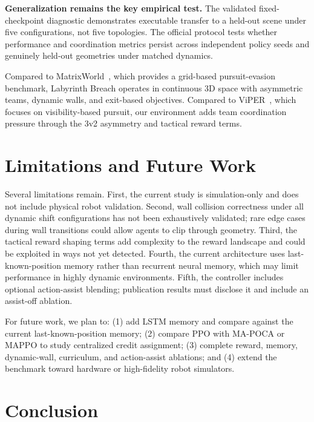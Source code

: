 \documentclass[conference]{IEEEtran}
\begin{document}
\textbf{Generalization remains the key empirical test.} The validated fixed-checkpoint diagnostic demonstrates executable transfer to a held-out scene under five configurations, not five topologies. The official protocol tests whether performance and coordination metrics persist across independent policy seeds and genuinely held-out geometries under matched dynamics.

Compared to MatrixWorld~\cite{matrixworld2023}, which provides a grid-based pursuit-evasion benchmark, Labyrinth Breach operates in continuous 3D space with asymmetric teams, dynamic walls, and exit-based objectives. Compared to ViPER~\cite{viper2025}, which focuses on visibility-based pursuit, our environment adds team coordination pressure through the 3v2 asymmetry and tactical reward terms.

\section{Limitations and Future Work}

Several limitations remain. First, the current study is simulation-only and does not include physical robot validation. Second, wall collision correctness under all dynamic shift configurations has not been exhaustively validated; rare edge cases during wall transitions could allow agents to clip through geometry. Third, the tactical reward shaping terms add complexity to the reward landscape and could be exploited in ways not yet detected. Fourth, the current architecture uses last-known-position memory rather than recurrent neural memory, which may limit performance in highly dynamic environments. Fifth, the controller includes optional action-assist blending; publication results must disclose it and include an assist-off ablation.

For future work, we plan to: (1) add LSTM memory and compare against the current last-known-position memory; (2) compare PPO with MA-POCA or MAPPO to study centralized credit assignment; (3) complete reward, memory, dynamic-wall, curriculum, and action-assist ablations; and (4) extend the benchmark toward hardware or high-fidelity robot simulators.

\section{Conclusion}
\end{document}
